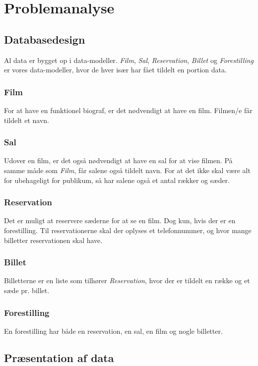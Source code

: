 \chapter{Problemanalyse}
\label{chapter:problemanalyse}

\section{Databasedesign}
Al data er bygget op i data-modeller. \textit{Film}, \textit{Sal}, \textit{Reservation}, \textit{Billet} og \textit{Forestilling} er vores data-modeller, hvor de hver især har fået tildelt en portion data.

\subsection{Film}
For at have en funktionel biograf, er det nødvendigt at have en film. 
Filmen/e får tildelt et navn.

\subsection{Sal}
Udover en film, er det også nødvendigt at have en sal for at vise filmen. På samme måde som \textit{Film}, får salene også tildelt navn. For at det ikke skal være alt for ubehageligt for publikum, så har salene også et antal rækker og sæder. 

\subsection{Reservation}
Det er muligt at reservere sæderne for at se en film. Dog kun, hvis der er en forestilling. Til reservationerne skal der oplyses et telefonnummer, og hvor mange billetter reservationen skal have.

\subsection{Billet}
Billetterne er en liste som tilhører \textit{Reservation}, hvor der er tildelt en række og et sæde pr. billet. 

\subsection{Forestilling}
En forestilling har både en reservation, en sal, en film og nogle billetter.

\section{Præsentation af data}


